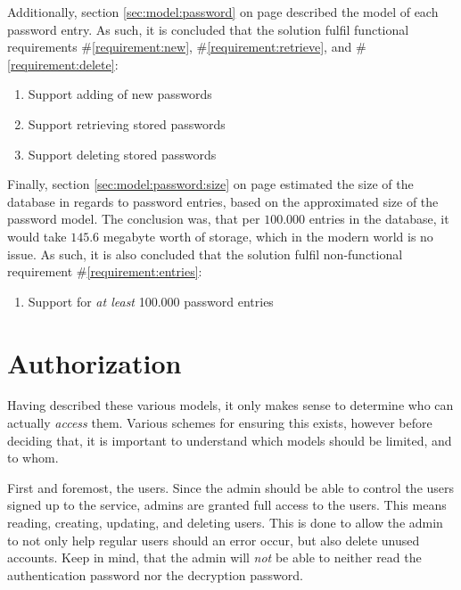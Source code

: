			Additionally, section \ref{sec:model:password} on page \pageref{sec:model:password} described the model of each password entry. As such, it is concluded that the solution fulfil functional requirements \#\ref{requirement:new}, \#\ref{requirement:retrieve}, and \#\ref{requirement:delete}:
			\vspace{-3ex}\begin{enumerate}
				\setlength\itemsep{0.1em}
				\setcounter{enumi}{10-1}
				\item Support adding of new passwords
				\item Support retrieving stored passwords
				\item Support deleting stored passwords
			\end{enumerate}

			Finally, section \ref{sec:model:password:size} on page \pageref{sec:model:password:size} estimated the size of the database in regards to password entries, based on the approximated size of the password model. The conclusion was, that per $100.000$ entries in the database, it would take $145.6$ megabyte worth of storage, which in the modern world is no issue. As such, it is also concluded that the solution fulfil non-functional requirement \#\ref{requirement:entries}:
			\vspace{-3ex}\begin{enumerate}
				\setlength\itemsep{0.1em}
				\setcounter{enumi}{3-1}
				\item Support for \emph{at least} 100.000 password entries
			\end{enumerate}

	\section{Authorization}
		\label{sec:design:authorization}
		Having described these various models, it only makes sense to determine who can actually \emph{access} them. Various schemes for ensuring this exists, however before deciding that, it is important to understand which models should be limited, and to whom.

		First and foremost, the users. Since the admin should be able to control the users signed up to the service, admins are granted full access to the users. This means reading, creating, updating, and deleting users. This is done to allow the admin to not only help regular users should an error occur, but also delete unused accounts. Keep in mind, that the admin will \emph{not} be able to neither read the authentication password nor the decryption password.

